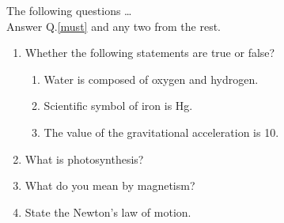 \documentclass[11pt,a4paper]{article}
\begin{document}
    The following questions …\\ Answer Q.\ref{must} and any two from the rest.
    \begin{enumerate}
        \item Whether the following statements are true or false?\label{must}
        \begin{enumerate}
            \item Water is composed of oxygen and hydrogen.
            \item Scientific symbol of iron is Hg.
            \item The value of the gravitational acceleration is 10.
        \end{enumerate}
        \item What is photosynthesis?
        \item What do you mean by magnetism?
        \item State the Newton’s law of motion.
    \end{enumerate}
\end{document}
